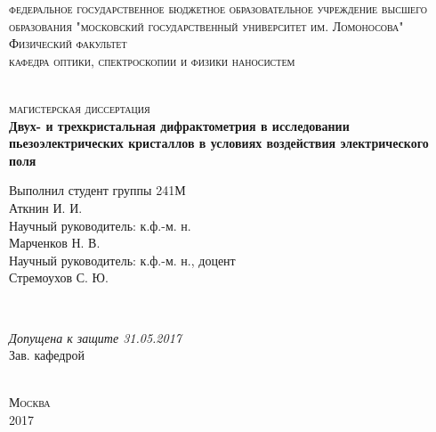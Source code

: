 \begin{titlepage}
  \begin{center}
    \textsc{\small \large федеральное государственное бюджетное образовательное
    учреждение высшего образования "московский государственный университет им. Ломоносова"}\\[0.3cm]
    \textsc{\large Физический факультет}\\[0.3cm]
    \textsc{\large кафедра оптики, спектроскопии и физики наносистем}\\[0.5cm]

    \begin{minipage}{\textwidth}
      \begin{flushleft}

      \end{flushleft}
    \end{minipage}\\[0.5cm]

    \textsc{\large  магистерская диссертация}\\[0.5cm]
    \textbf{\large Двух- и трехкристальная дифрактометрия в исследовании
    пьезоэлектрических кристаллов в условиях воздействия электрического поля}\\[1.5cm]


    \begin{minipage}{\textwidth}
      \begin{flushright}
        Выполнил студент группы 241М \hspace*{2.1cm} \\
        Аткнин И. И.\underline{\hspace*{4.6cm}}\\[0.5cm]
        Научный руководитель: к.ф.-м. н. \hspace*{1.8cm} \\
        Марченков Н. В. \underline{\hspace*{3.7cm}}\\[0.5cm]
        Научный руководитель: к.ф.-м. н., доцент\\
        Стремоухов С. Ю. \underline{\hspace*{3.7cm}}\\[0.5cm]
      \end{flushright}
    \end{minipage}\\[1.5cm]


    \begin{minipage}{\textwidth}
      \begin{flushleft}
        \textit{Допущена к защите 31.05.2017}\\
        Зав. кафедрой \underline{\hspace*{4.5cm}}\\
      \end{flushleft}
    \end{minipage}\\[1.5cm]

    \vfill
    \textsc{\small Москва\\ 2017}
  \end{center}
\end{titlepage}
